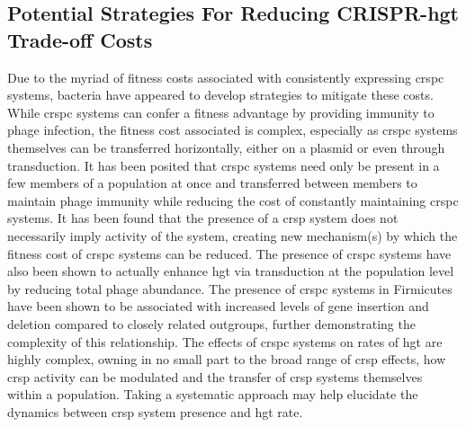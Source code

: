\subsection*{Potential Strategies For Reducing CRISPR-\ac{hgt} Trade-off Costs}
Due to the  myriad of fitness costs associated with consistently expressing \ac{crspc} systems, bacteria have appeared to develop strategies to mitigate these costs.
While \ac{crspc} systems can confer a fitness advantage by providing immunity to phage infection, the fitness cost associated is complex, especially as \ac{crspc} systems  themselves can be transferred  horizontally, either on a plasmid or even through transduction\citep{crisprlgt}.
It has been posited that \ac{crspc} systems need only be present in a few members of a population at once and transferred between members to maintain phage immunity while reducing the cost of constantly maintaining \ac{crspc} systems\citep{acqorres}.
It has been found that the presence of a \ac{crsp} system does not necessarily imply activity of the system, creating new mechanism(s) by which the fitness cost of \ac{crspc} systems can be reduced\citep{acqorres}.
The presence of \ac{crspc} systems have also been shown to actually enhance \ac{hgt} via transduction at the population level by reducing total phage abundance\citep{transhgt}.
The presence of \ac{crspc} systems in Firmicutes have been shown to be associated with increased levels of gene insertion and deletion compared to closely related outgroups, further demonstrating the complexity of this relationship\citep{athena}.
The effects of \ac{crspc} systems on rates of \ac{hgt} are highly complex, owning in no small part to the broad range of \ac{crsp} effects, how \ac{crsp} activity can be modulated and the transfer of \ac{crsp} systems themselves within a population\citep{acqorres}.
Taking a systematic approach may help elucidate the dynamics between \ac{crsp} system presence and \ac{hgt} rate.
